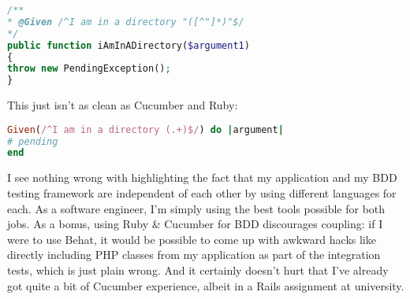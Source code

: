 \begin{minipage}{\textwidth}
\begin{lstlisting}[language=php]
/**
* @Given /^I am in a directory "([^"]*)"$/
*/
public function iAmInADirectory($argument1)
{
throw new PendingException();
}
\end{lstlisting}
\end{minipage}

This just isn't as clean as Cucumber and Ruby:

\begin{minipage}{\textwidth}
\begin{lstlisting}[language=ruby]
Given(/^I am in a directory (.+)$/) do |argument|
# pending
end
\end{lstlisting}
\end{minipage}

I see nothing wrong with highlighting the fact that my application and my BDD testing framework are independent of each other by using different languages for each. As a software engineer, I'm simply using the best tools possible for both jobs. As a bonus, using Ruby \& Cucumber for BDD discourages coupling: if I were to use Behat, it would be possible to come up with awkward hacks like directly including PHP classes from my application as part of the integration tests, which is just plain wrong. And it certainly doesn't hurt that I've already got quite a bit of Cucumber experience, albeit in a Rails assignment at university.